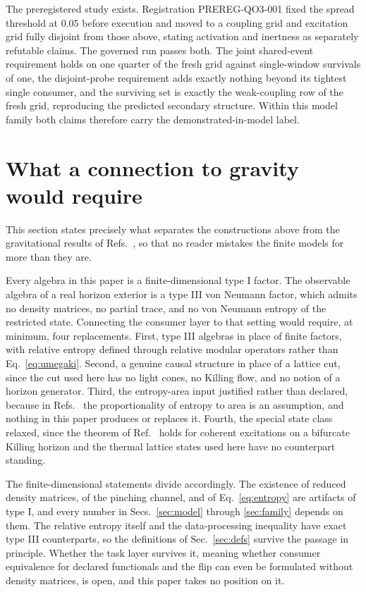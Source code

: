 \documentclass[aps,prd,reprint,nofootinbib,longbibliography]{revtex4-2}
\begin{document}
The preregistered study exists.  Registration PREREG-QO3-001 fixed the
spread threshold at $0.05$ before execution and moved to a coupling grid
and excitation grid fully disjoint from those above, stating activation
and inertness as separately refutable claims.  The governed run passes
both.  The joint shared-event requirement holds on one quarter of the
fresh grid against single-window survivals of one, the disjoint-probe
requirement adds exactly nothing beyond its tightest single consumer,
and the surviving set is exactly the weak-coupling row of the fresh
grid, reproducing the predicted secondary structure.  Within this model
family both claims therefore carry the demonstrated-in-model label.

\section{What a connection to gravity would require}
\label{sec:gap}

This section states precisely what separates the constructions above from
the gravitational results of
Refs.~\cite{Jacobson1995,DorauMuch2026}, so that no reader mistakes the
finite models for more than they are.

Every algebra in this paper is a finite-dimensional type I factor.  The
observable algebra of a real horizon exterior is a type III von Neumann
factor, which admits no density matrices, no partial trace, and no von
Neumann entropy of the restricted state.  Connecting the consumer layer to
that setting would require, at minimum, four replacements.  First, type
III algebras in place of finite factors, with relative entropy defined
through relative modular operators rather than
Eq.~\eqref{eq:umegaki}.  Second, a genuine causal structure in place of a
lattice cut, since the cut used here has no light cones, no Killing flow,
and no notion of a horizon generator.  Third, the entropy-area input
justified rather than declared, because in Refs.~\cite{Jacobson1995,
DorauMuch2026} the proportionality of entropy to area is an assumption,
and nothing in this paper produces or replaces it.  Fourth, the special
state class relaxed, since the theorem of Ref.~\cite{DorauMuch2026} holds
for coherent excitations on a bifurcate Killing horizon and the thermal
lattice states used here have no counterpart standing.

The finite-dimensional statements divide accordingly.  The existence of
reduced density matrices, of the pinching channel, and of
Eq.~\eqref{eq:entropy} are artifacts of type I, and every number in
Secs.~\ref{sec:model} through \ref{sec:family} depends on them.  The
relative entropy itself and the data-processing inequality have exact
type III counterparts, so the definitions of Sec.~\ref{sec:defs} survive
the passage in principle.  Whether the task layer survives it, meaning
whether consumer equivalence for declared functionals and the flip can
even be formulated without density matrices, is open, and this paper
takes no position on it.
\end{document}
